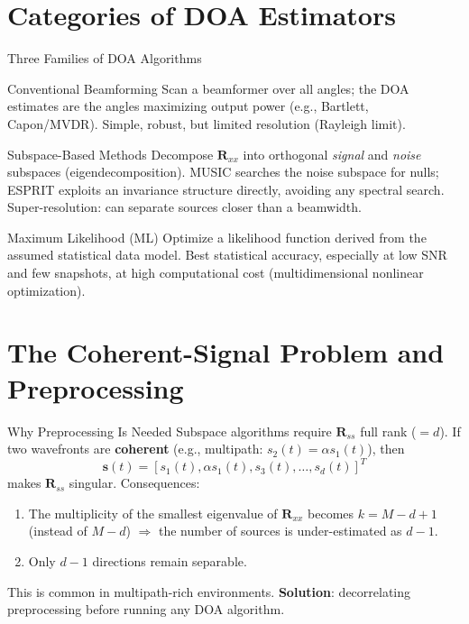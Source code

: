 \documentclass[10pt,aspectratio=169]{beamer}
\newcommand{\bs}{\bm{s}}
\newcommand{\bR}{\bm{R}}
\begin{document}
\section{Categories of DOA Estimators}

\begin{frame}{Three Families of DOA Algorithms}
\begin{block}{Conventional Beamforming}
Scan a beamformer over all angles; the DOA estimates are the angles maximizing output power (e.g., Bartlett, Capon/MVDR). Simple, robust, but limited resolution (Rayleigh limit).
\end{block}
\begin{block}{Subspace-Based Methods}
Decompose $\bR_{xx}$ into orthogonal \emph{signal} and \emph{noise} subspaces (eigendecomposition). MUSIC searches the noise subspace for nulls; ESPRIT exploits an invariance structure directly, avoiding any spectral search. Super-resolution: can separate sources closer than a beamwidth.
\end{block}
\begin{block}{Maximum Likelihood (ML)}
Optimize a likelihood function derived from the assumed statistical data model. Best statistical accuracy, especially at low SNR and few snapshots, at high computational cost (multidimensional nonlinear optimization).
\end{block}
\end{frame}

\section{The Coherent-Signal Problem and Preprocessing}

\begin{frame}{Why Preprocessing Is Needed}
Subspace algorithms require $\bR_{ss}$ full rank ($=d$). If two wavefronts are \textbf{coherent} (e.g., multipath: $s_2(t)=\alpha s_1(t)$), then
\begin{equation}
	\bs(t) = [s_1(t), \alpha s_1(t), s_3(t), \dots, s_d(t)]^T
	\label{eq:4-2}
\end{equation}
makes $\bR_{ss}$ singular. Consequences:
\begin{enumerate}
	\item The multiplicity of the smallest eigenvalue of $\bR_{xx}$ becomes $k=M-d+1$ (instead of $M-d$) $\Rightarrow$ the number of sources is under-estimated as $d-1$.
	\item Only $d-1$ directions remain separable.
\end{enumerate}
This is common in multipath-rich environments. \textbf{Solution}: decorrelating preprocessing before running any DOA algorithm.
\end{frame}
\end{document}
